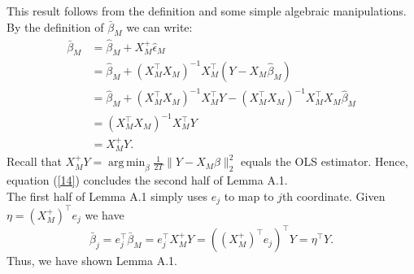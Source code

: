 \documentclass[11pt]{article}
\newcommand{\NL}{\\[.4cm]}
\DeclareMathOperator*{\argmin}{arg\,min}
\begin{document}
	This result follows from the definition and some simple algebraic manipulations. By the definition of $\bar{\beta}_M$ we can write: 
	\begin{equation}\label{14}
		\begin{split}
			\bar{\beta}_M
			&=\hat{\beta}_M+X_M^+\hat{\epsilon}_M\\
			&=\hat{\beta}_M+(X_M^\top X_M)^{-1}X_M^\top (Y-X_M\hat{\beta}_M)\\
			&=\hat{\beta}_M+(X_M^\top X_M)^{-1}X_M^\top Y-(X_M^\top X_M)^{-1}X_M^\top X_M\hat{\beta}_M\\
			&=(X_M^\top X_M)^{-1}X_M^\top Y\\
			&=X_M^+Y.
		\end{split}
	\end{equation}
	Recall that $X_M^+Y=\argmin_\beta\frac{1}{2T}\|Y-X_M\beta\|_2^2$ equals the OLS estimator. Hence, equation (\ref{14}) concludes the second half of Lemma A.1.\NL
	The first half of Lemma A.1 simply uses $e_j$ to map to $j$th coordinate. Given $\eta=(X_M^+)^\top e_j$ we have
	\begin{equation}
		\bar{\beta}_{j}=e_j^\top \bar{\beta}_M=e_j^\top X_M^+Y=((X_M^+)^\top e_j)^\top Y=\eta^\top Y.
	\end{equation}
	Thus, we have shown Lemma A.1.
	
\end{document}
